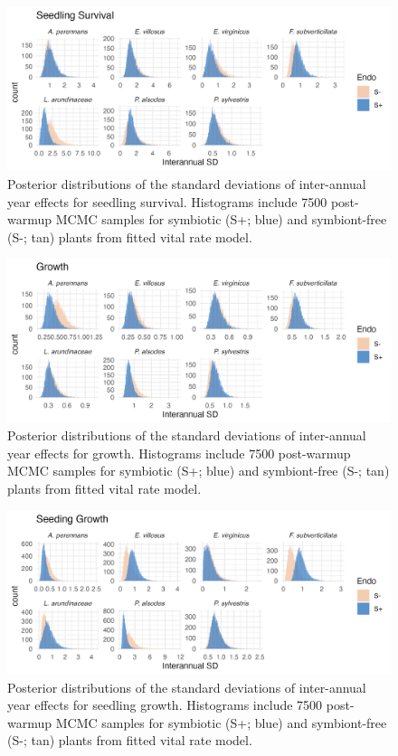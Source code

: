 \documentclass[9pt,twoside,lineno]{pnas-new}
\begin{document}
\newpage

\begin{figure}
	\centering
	\includegraphics[width=.9\linewidth]{seedsurv_sigmayear_hist.png}
	\caption{Posterior distributions of the standard deviations of inter-annual year effects for seedling survival. Histograms include 7500 post-warmup MCMC samples for symbiotic (S+; blue) and symbiont-free (S-; tan) plants from fitted vital rate model.}
\end{figure}

\newpage

\begin{figure}
	\centering
	\includegraphics[width=.9\linewidth]{grow_sigmayear_hist.png}
	\caption{Posterior distributions of the standard deviations of inter-annual year effects for growth. Histograms include 7500 post-warmup MCMC samples for symbiotic (S+; blue) and symbiont-free (S-; tan) plants from fitted vital rate model.}
\end{figure}
\newpage

\begin{figure}
	\centering
	\includegraphics[width=.9\linewidth]{seedgrow_sigmayear_hist.png}
	\caption{Posterior distributions of the standard deviations of inter-annual year effects for seedling growth. Histograms include 7500 post-warmup MCMC samples for symbiotic (S+; blue) and symbiont-free (S-; tan) plants from fitted vital rate model.}
\end{figure}
\end{document}
